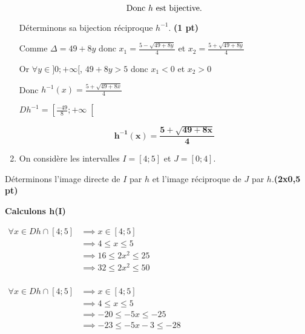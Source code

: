 \documentclass[12pt,a4paper]{article}
\begin{document}
\begin{enumerate}
          \begin{resultbox}
            \[
                \mathbf{\text{Donc \( h \) est bijective.}}
            \]
        \end{resultbox}
   
   Déterminons sa bijection réciproque \( h^{-1} \). \hfill \textbf{(1 pt)}

   Comme \( \Delta = 49+8y \) donc \( x_{1} = \frac{5-\sqrt{49+8y}}{4} \) et \( x_{2} = \frac{5+\sqrt{49+8y}}{4} \) 

   Or \(\forall y \in ]0;+\infty[ \), \( 49+8y > 5 \) donc \( x_{1}<0 \) et \( x_{2}>0 \)

   Donc \( h^{-1}(x) = \frac{5+\sqrt{49+8x}}{4} \)
   
   \( Dh^{-1}=\left[\frac{-49}{8};+\infty\right[\)

   \begin{resultbox}
    \[
        \mathbf{ h^{-1}(x) = \frac{5+\sqrt{49+8x}}{4} }
    \]
    \end{resultbox}

   \item On considère les intervalles \( I = [4 ; 5] \) et \( J = [0 ; 4] \).
\end{enumerate}

Déterminons l’image directe de $I$ par $h$ et l’image réciproque de $J$ par $h$.\hfill \textbf{(2x0,5 pt)}

\textbf{Calculons h(I)}

\( 
\begin{aligned}
    \forall x \in Dh \cap [4 ; 5] &\implies x \in [4 ; 5] \\
                                &\implies 4 \leq x \leq 5 \\
                                &\implies 16 \leq 2x^{2} \leq 25 \\
                                &\implies 32 \leq 2x^{2} \leq 50 \\
\end{aligned} 
\) 

\( 
\begin{aligned}
    \forall x \in Dh \cap [4 ; 5] &\implies x \in [4 ; 5] \\
                                &\implies 4 \leq x \leq 5 \\
                                &\implies -20 \leq -5x \leq -25 \\
                                &\implies -23 \leq -5x -3 \leq -28 \\
\end{aligned} 
\) 
\end{document}
